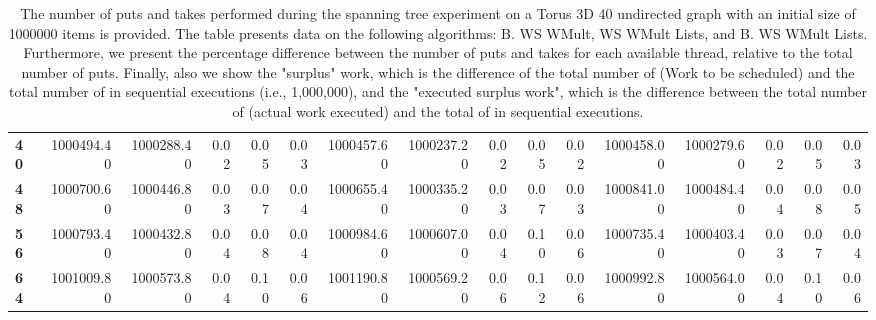 \begin{table}[!ht]
{\begin{tabular}{lrrrrrrrrrrrrrrr}
\textbf{40} &  1000494.40 & 1000288.40 &           0.02 &        0.05 &                 0.03 &     1000457.60 & 1000237.20 &           0.02 &        0.05 &                 0.02 &        1000458.00 & 1000279.60 &           0.02 &        0.05 &                 0.03 \\
\textbf{48} &  1000700.60 & 1000446.80 &           0.03 &        0.07 &                 0.04 &     1000655.40 & 1000335.20 &           0.03 &        0.07 &                 0.03 &        1000841.00 & 1000484.40 &           0.04 &        0.08 &                 0.05 \\
\textbf{56} &  1000793.40 & 1000432.80 &           0.04 &        0.08 &                 0.04 &     1000984.60 & 1000607.00 &           0.04 &        0.10 &                 0.06 &        1000735.40 & 1000403.40 &           0.03 &        0.07 &                 0.04 \\
\textbf{64} &  1001009.80 & 1000573.80 &           0.04 &        0.10 &                 0.06 &     1001190.80 & 1000569.20 &           0.06 &        0.12 &                 0.06 &        1000992.80 & 1000564.00 &           0.04 &        0.10 &                 0.06 \\
\bottomrule
\end{tabular}}
\label{difference-Torus_3D_40_undirected-1000000-B_WS_NC_MULT_OPT-WS_NC_MULT_LA_OPT-B_WS_NC_MULT_LA_OPT}
\caption{The number of puts and takes performed during the
    spanning tree experiment on a Torus 3D 40 undirected graph with an initial size
    of 1000000 items is provided. The table presents data on the
    following algorithms: B. WS WMult, WS WMult Lists, and
    B. WS WMult Lists. Furthermore, we present the percentage difference
    between the number of puts and takes for each available thread,
    relative to the total number of puts. Finally, also we show the
    "surplus" work, which is the difference of the total number of
    \Puts (Work to be scheduled) and the total number of \Puts in
    sequential executions (i.e., 1,000,000), and the "executed surplus
    work", which is the difference between the total number of \Takes
    (actual work executed) and the total of \Takes in sequential
    executions.}
\end{table}
